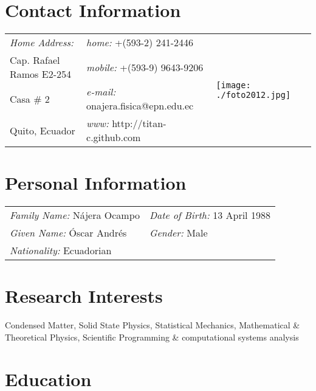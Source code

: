 \documentclass[margin,line]{res}
\newenvironment{list1}{
  \begin{list}{\ding{113}}{%
      \setlength{\itemsep}{0in}
      \setlength{\parsep}{0in} \setlength{\parskip}{0in}
      \setlength{\topsep}{0in} \setlength{\partopsep}{0in} 
      \setlength{\leftmargin}{0.17in}}}{\end{list}}
\begin{document}

\begin{resume}

\section{\sc Contact Information}
  \begin{tabular}{@{}p{2in}p{2.5in}p{3cm} }
    {\it Home Address:}		& {\it home:}  +(593-2) 241-2446 &
      \multirow{4}{*}{ \texttt{[image: ./foto2012.jpg]}}\\

    Cap. Rafael Ramos E2-254	& {\it mobile:} +(593-9) 9643-9206 \\
    Casa \# 2			& {\it e-mail:}  onajera.fisica@epn.edu.ec\\
    Quito, Ecuador		& {\it www:} http://titan-c.github.com
  \end{tabular}\vspace{0.5cm}

\section{\sc Personal Information}
 \begin{tabular}{ll}
  {\it Family Name:} Nájera Ocampo & {\it Date of Birth:} 13 April 1988\\
  {\it Given Name:} Óscar Andrés   & {\it Gender:} Male\\
  {\it Nationality:} Ecuadorian    & %
 \end{tabular}

\section{\sc Research Interests}
  Condensed Matter, Solid State Physics, Statistical Mechanics, Mathematical \& Theoretical Physics, Scientific Programming \& computational systems analysis

\section{\sc Education}


\end{resume}
\end{document}
